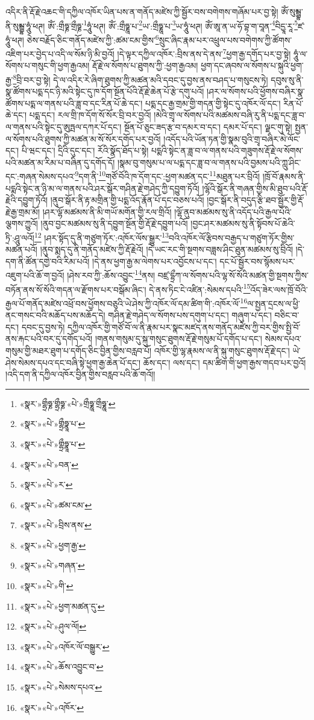 འདིར་ནི་རྡོ་རྗེ་འཆང་གི་དཀྱིལ་འཁོར་ཡིན་པས་ན་གནོད་མཛེས་ཀྱི་སྦྱོར་བས་བགེགས་གཞོམ་པར་བྱ་སྟེ། ཨོཾ་སུམྦྷ་ནི་སུམྦྷ་ཧཱུཾ་ཕཊ། ཨོཾ་:གྲྀཧྞ་གྲྀཧྞ་\footnote{«སྣར་»གྷྲྀཧྞ་གྷྲྀཧྞ་«པེ་»གྲྀཧྞཱ་གྲྀཧྞཱ་}ཧཱུཾ་ཕཊ། ཨོཾ་:གྲྀཧྞཱ་པ་\footnote{«སྣར་»«པེ་»གྷྲྀཧྣཱ་པ་}ཡ་:གྲྀཧྞཱ་པ་\footnote{«སྣར་»«པེ་»གྷྲྀཧྣཱ་པ་}ཡ་ཧཱུཾ་ཕཊ། ཨོཾ་ཨཱ་ན་ཡ་ཧོ་བྷ་ག་བཱན་\footnote{«སྣར་»«པེ་»བན་}བིདྱཱ་རཱ་\footnote{«སྣར་»«པེ་»ར་}ཛ་ཧཱུཾ་ཕཊ། ཅེས་བརྗོད་ཅིང་གནོད་མཛེས་ཀྱི་:ཚམ་ངམ་གྱིས་\footnote{«སྣར་»«པེ་»ཚམ་ངམ་}སྲུང་ཞིང་རྣམ་པར་འཕྲུལ་པས་བགེགས་ཀྱི་ཚོགས་འཇིག་པར་བྱེད་པ་འདི་ལ་སོམ་ཉི་མི་བྱའོ། །དེ་ལྟར་དཀྱིལ་འཁོར་:བྲིས་ནས་དེ་ནས་\footnote{«སྣར་»«པེ་»བྲིས་ནས་}ཕྱག་རྒྱ་དགོད་པར་བྱ་སྟེ། ཧཱུཾ་ལ་སོགས་པ་གསུང་གི་ཕྱག་རྒྱའམ། རྡོ་རྗེ་ལ་སོགས་པ་ཐུགས་ཀྱི་:ཕྱག་རྒྱའམ། ཕྱག་དང་ཞབས་ལ་སོགས་པ་སྐུའི་ཕྱག་རྒྱ་\footnote{«སྣར་»«པེ་»ཕྱག་རྒྱ་}བྲི་བར་བྱ་སྟེ། དེ་ལ་འདིར་རེ་ཞིག་ཐུགས་ཀྱི་མཚན་མའི་དབང་དུ་བྱས་ནས་བཤད་པ་གསུངས་ཏེ། དབུས་སུ་ནི་སྣ་ཚོགས་པདྨ་དང་ཉི་མའི་སྟེང་དུ་ཁ་དོག་སྔོན་པོའི་རྡོ་རྗེ་ཆེན་པོ་རྩེ་དགུ་པའོ། །ཤར་ལ་སོགས་པའི་ཕྱོགས་བཞིར་སྣ་ཚོགས་པདྨ་ལ་གནས་པའི་ཟླ་བ་དང་རིན་པོ་ཆེ་དང་། པདྨ་དང་རྒྱ་གྲམ་གྱི་གདན་གྱི་སྟེང་དུ་འཁོར་ལོ་དང་། རིན་པོ་ཆེ་དང་། པདྨ་དང་། རལ་གྲི་ཁ་དོག་སོ་སོར་བྲི་བར་བྱའོ། །མེའི་གྲྭ་ལ་སོགས་པའི་མཚམས་བཞི་རུ་ནི་པདྨ་དང་ཟླ་བ་ལ་གནས་པའི་སྟེང་དུ་ཨུཏྤལ་དཀར་པོ་དང་། སྔོན་པོ་ཅུང་ཟད་རྩ་བ་དམར་བ་དང་། དམར་པོ་དང་། ལྗང་གུ་སྟེ། སྤྱན་ལ་སོགས་པའི་ཐུགས་ཀྱི་མཚན་མ་སོ་སོར་དགོད་པར་བྱའོ། །འདོད་པའི་ཡོན་ཏན་གྱི་སྣམ་བུའི་གྲྭ་བཞིར་མེ་ལོང་དང་། པི་ཝང་དང་། དྲིའི་དུང་དང་། རོའི་སྣོད་ཐོད་པ་སྟེ། པདྨའི་སྟེང་ན་ཟླ་བ་ལ་གནས་པའི་གཟུགས་རྡོ་རྗེ་ལ་སོགས་པའི་མཚན་མ་རིམ་པ་བཞིན་དུ་དགོད་དོ། །སྣམ་བུ་གསུམ་པ་ལ་པདྨ་དང་ཟླ་བ་ལ་གནས་པའི་བྱམས་པའི་ཀླུ་ཤིང་དང་:གཞན་སེམས་དཔའ་\footnote{«སྣར་»«པེ་»གཞན་}དག་ནི་\footnote{«སྣར་»«པེ་»གི་}གཙོ་བོའི་ཁ་དོག་དང་:ཕྱག་མཚན་དང་\footnote{«སྣར་»«པེ་»ཕྱག་མཚན་དུ་}མཐུན་པར་བྲིའོ། །ཁྲོ་བོ་རྣམས་ནི་པདྨའི་སྟེང་ན་ཉི་མ་ལ་གནས་པའི་ཤར་སྒོར་གཤིན་རྗེ་གཤེད་ཀྱི་དབྱུག་ཏོའོ། །ལྷོའི་སྒོར་ནི་གཞན་གྱིས་མི་ཐུབ་པའི་རྡོ་རྗེའི་དབྱུག་ཏོའོ། །ནུབ་སྒོར་ནི་རྟ་མགྲིན་གྱི་པདྨ་འོད་རྣོན་པོ་དང་བཅས་པའོ། །བྱང་སྒོར་ནི་བདུད་རྩི་ཐབ་སྦྱོར་གྱི་རྡོ་རྗེ་རྒྱ་གྲམ་མོ། །ཤར་ལྷོ་མཚམས་ནི་མི་གཡོ་མགོན་གྱི་རལ་གྲིའོ། །ལྷོ་ནུབ་མཚམས་སུ་ནི་འདོད་པའི་རྒྱལ་པོའི་ལྕགས་ཀྱུའོ། །ནུབ་བྱང་མཚམས་སུ་ནི་དབྱུག་སྔོན་གྱི་རྡོ་རྗེ་དབྱུག་པའོ། །བྱང་ཤར་མཚམས་སུ་ནི་སྟོབས་པོ་ཆེའི་ཏྲི་:ཤཱུ་ལའོ།\footnote{«སྣར་»«པེ་»ཤུལ་ལོ།} །ཤར་སྟོད་དུ་ནི་གཙུག་ཏོར་:འཁོར་ལོས་སྒྱུར་\footnote{«སྣར་»«པེ་»འཁོར་ལོ་བསྒྱུར་}བའི་འཁོར་ལོ་རྩིབས་བརྒྱད་པ་གཙུག་ཏོར་གྱིས་མཚན་པའོ། །ནུབ་སྨད་དུ་ནི་གནོད་མཛེས་ཀྱི་རྡོ་རྗེའོ། །དེ་ཡང་རང་གི་སྔགས་བཟླས་ཤིང་ཐུན་མཚམས་སུ་བྲིའོ། །དེ་དག་ནི་ཚོན་དགྱེ་བའི་རིམ་པའོ། །དེ་ནས་ཕྱག་རྒྱ་མ་ལེགས་པར་འབྱོངས་པ་དང་། དང་པོ་སྦྱོར་བས་སྙོམས་པར་འཇུག་པའི་ཆོ་ག་བྱའོ། །ཤེས་རབ་ཀྱི་:ཆོས་འབྱུང་\footnote{«སྣར་»«པེ་»ཆོས་འབྱུང་བ་}ནས། བཛྲ་དྷྲྀཀ་ལ་སོགས་པའི་ལྷ་སོ་སོའི་མཚན་གྱི་སྔགས་ཀྱིས་བཏོན་ནས་སོ་སོའི་གདན་ལ་རྫོགས་པར་བསྒོམ་ཞིང་། དེ་ནས་ཏིང་ངེ་འཛིན་:སེམས་དཔའི་\footnote{«སྣར་»«པེ་»སེམས་དཔའ་}འོད་ཟེར་ལས་ཁྲོ་བོའི་རྒྱལ་པོ་གནོད་མཛེས་འཕྲོ་བས་ཕྱོགས་བཅུའི་ཡེ་ཤེས་ཀྱི་འཁོར་ལོ་དམ་ཚིག་གི་:འཁོར་ལོ་\footnote{«སྣར་»«པེ་»འཁོར་}ལ་སྤྱན་དྲངས་ལ་ཕྱི་ནང་གསང་བའི་མཆོད་པས་མཆོད་དེ། གཤིན་རྗེ་གཤེད་ལ་སོགས་པས་དགུག་པ་དང་། གཞུག་པ་དང་། བཅིང་བ་དང་། དབང་དུ་བྱས་ཏེ། དཀྱིལ་འཁོར་གྱི་གཙོ་བོ་ལ་ནི་རྣམ་པར་སྣང་མཛད་ནས་གནོད་མཛེས་ཀྱི་བར་གྱིས་སྤྱི་བོ་ནས་རྐང་པའི་བར་དུ་དགོད་པའོ། །གནས་གསུམ་དུ་སྐུ་གསུང་ཐུགས་རྡོ་རྗེ་གསུམ་པོ་དགོད་པ་དང་། སེམས་དཔའ་གསུམ་གྱི་མཐར་ཐུག་པ་དགོད་ཅིང་བྱིན་གྱིས་བརླབ་པོ། འཁོར་གྱི་ལྷ་རྣམས་ལ་ནི་སྐུ་གསུང་ཐུགས་རྡོ་རྗེ་དང་། ཡེ་ཤེས་སེམས་དཔའ་དང་བཞི་སྟེ་ཕྱག་རྒྱ་ཆེན་པོ་དང་། ཆོས་དང་། ལས་དང་། དམ་ཚིག་གི་ཕྱག་རྒྱས་གདབ་པར་བྱའོ། །འདི་དག་ནི་དཀྱིལ་འཁོར་བྱིན་གྱིས་བརླབ་པའི་ཆོ་གའོ།། 